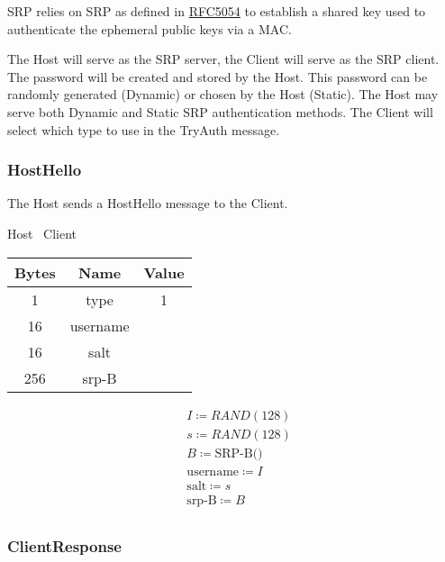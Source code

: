 SRP relies on SRP as defined in \href{https://datatracker.ietf.org/doc/html/rfc5054}{RFC5054} to establish a
shared key used to authenticate the ephemeral public keys via a MAC.

The Host will serve as the SRP server, the Client will serve as the SRP client.
The password will be created and stored by the Host.
This password can be randomly generated (Dynamic) or chosen by the Host (Static).
The Host may serve both Dynamic and Static SRP authentication methods.
The Client will select which type to use in the TryAuth message.
\\

\subsubsection{HostHello}

The Host sends a HostHello message to the Client.

\begin{center}
    Host \textrightarrow\ Client\\
    \begin{tabular}{|c|c|c|}
        \hline
        \textbf{Bytes} & \textbf{Name} & \textbf{Value} \\
        \hline
        1              & type          & 1              \\
        \hline
        16             & username      &                \\
        \hline
        16             & salt          &                \\
        \hline
        256            & srp-B         &                \\
        \hline
    \end{tabular}
\end{center}

\begin{align*}
    & I \coloneqq RAND(128)\\
    & s \coloneqq RAND(128)\\
    & B \coloneqq \text{SRP-B()}\\
    & \text{username} \coloneqq I\\
    & \text{salt} \coloneqq s\\
    & \text{srp-B} \coloneqq B\\
\end{align*}

\subsubsection{ClientResponse}

